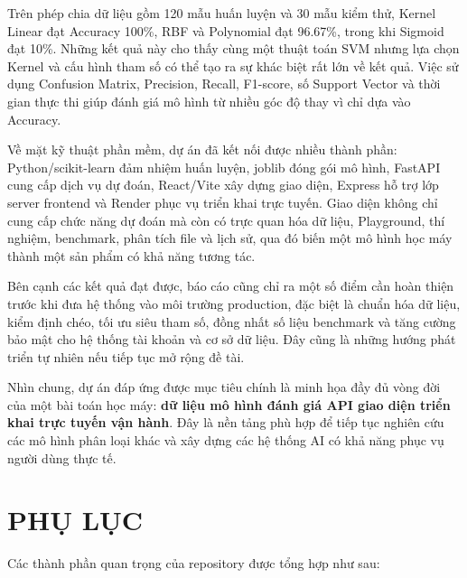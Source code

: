 \documentclass{article}
\begin{document}
	Trên phép chia dữ liệu gồm 120 mẫu huấn luyện và 30 mẫu kiểm thử, Kernel Linear đạt Accuracy 100\%, RBF và Polynomial đạt 96.67\%, trong khi Sigmoid đạt 10\%. Những kết quả này cho thấy cùng một thuật toán SVM nhưng lựa chọn Kernel và cấu hình tham số có thể tạo ra sự khác biệt rất lớn về kết quả. Việc sử dụng Confusion Matrix, Precision, Recall, F1-score, số Support Vector và thời gian thực thi giúp đánh giá mô hình từ nhiều góc độ thay vì chỉ dựa vào Accuracy.
	
	Về mặt kỹ thuật phần mềm, dự án đã kết nối được nhiều thành phần: Python/scikit-learn đảm nhiệm huấn luyện, joblib đóng gói mô hình, FastAPI cung cấp dịch vụ dự đoán, React/Vite xây dựng giao diện, Express hỗ trợ lớp server frontend và Render phục vụ triển khai trực tuyến. Giao diện không chỉ cung cấp chức năng dự đoán mà còn có trực quan hóa dữ liệu, Playground, thí nghiệm, benchmark, phân tích file và lịch sử, qua đó biến một mô hình học máy thành một sản phẩm có khả năng tương tác.
	
	Bên cạnh các kết quả đạt được, báo cáo cũng chỉ ra một số điểm cần hoàn thiện trước khi đưa hệ thống vào môi trường production, đặc biệt là chuẩn hóa dữ liệu, kiểm định chéo, tối ưu siêu tham số, đồng nhất số liệu benchmark và tăng cường bảo mật cho hệ thống tài khoản và cơ sở dữ liệu. Đây cũng là những hướng phát triển tự nhiên nếu tiếp tục mở rộng đề tài.
	
	Nhìn chung, dự án đáp ứng được mục tiêu chính là minh họa đầy đủ vòng đời của một bài toán học máy: \textbf{dữ liệu \textrightarrow{} mô hình \textrightarrow{} đánh giá \textrightarrow{} API \textrightarrow{} giao diện \textrightarrow{} triển khai trực tuyến \textrightarrow{} vận hành}. Đây là nền tảng phù hợp để tiếp tục nghiên cứu các mô hình phân loại khác và xây dựng các hệ thống AI có khả năng phục vụ người dùng thực tế.
	
	\newpage
	\section{\centering PHỤ LỤC}
	\appendix
	
	Các thành phần quan trọng của repository được tổng hợp như sau:
	
\end{document}
